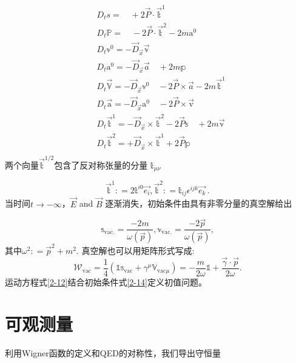 \begin{equation}\label{2-12}
\begin{aligned}
&D_{t} s=\quad+2 \vec{P} \cdot \overrightarrow{\mathbb{t}}^{1} \\
&D_{t} \mathbb{P}=\quad-2 \vec{P} \cdot \overrightarrow{\mathbb{t}}^{2}-2 m \mathrm{a}^{0} \\
&D_{t} \mathbb{\mathbb { v }}^{0}=-\vec{D}_{\vec{x}} \overrightarrow{\mathbb{v}} \\
&D_{t} \mathrm{a}^{0}=-\vec{D}_{\vec{x}} \vec{a} \quad+2 m \mathbb{p} \\
&D_{t} \overrightarrow{\mathbb{V}}=-\vec{D}_{\vec{x}} \mathbb{v}^{0} \quad-2 \vec{P} \times \vec{a}-2 m \overrightarrow{\mathbb{t}}^{1} \\
&D_{t} \overrightarrow{\mathrm{a}}=-\vec{D}_{\vec{x}} \mathrm{a}^{0} \quad-2 \vec{P} \times \overrightarrow{\mathrm{v}} \\
&D_{t} \overrightarrow{\mathbb{t}}^{1}=-\vec{D}_{\vec{x}} \times \overrightarrow{\mathbb{t}}^{2}-2 \vec{P}\mathbb{s} \quad+2 m \overrightarrow{\mathbb{v}} \\
&D_{t} \overrightarrow{\mathbb{t}}^{2}=+\vec{D}_{\vec{x}} \times \overrightarrow{\mathbb{t}}^{1}+2 \vec{P} \mathbb{p} \\
\end{aligned}
\end{equation}
两个向量$\vec{\mathbb{t}}^{1/2}$包含了反对称张量的分量 ${\mathbb{t}}_{\mu\nu}$

\begin{equation}
\vec {\mathbb{t}}^{1} : = 2 \mathbb{t}^{i0}\vec{e_i},  
\vec {\mathbb{t}}^{2} : = \mathbb{t}_{ij}\epsilon^{ijk}\vec{e_k}\,.
\end{equation}
当时间$t\to -\infty$，$\vec{E}$ and $\vec{B}$ 逐渐消失，初始条件由具有非零分量的真空解给出

\begin{equation}\label{2-14}
\mathbb{s}_{\mathrm{vac.}}=\frac{-2m}{\omega(\vec{p})},
\mathbb{v}_{\mathrm{vac.}}=\frac{-2\vec{p}}{\omega(\vec{p})},
\end{equation}
其中$\omega^2: = \vec{p}^2+m^2$.
真空解也可以用矩阵形式写成:
\begin{equation}
\mathcal{W}_{\mathrm{vac}}=\frac14(\mathbb{1}\mathbb{s}_{\mathrm{vac}}+\gamma^\mu\mathbb{V}_{\mathrm{vac}\mu})=-\frac m{2\omega}\mathbb{1}+\frac{\vec{\gamma}\cdot\vec{p}}{2\omega}.
\end{equation}
运动方程式\ref{2-12}结合初始条件式\ref{2-14}定义初值问题。

\section{可观测量} 
利用Wigner函数的定义和QED的对称性，我们导出守恒量

